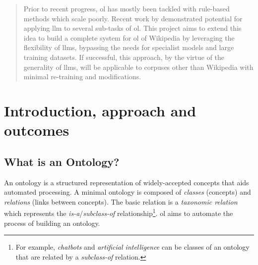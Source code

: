 
\begin{abstract}
    \noindent Prior to recent progress, \gls{ol} has mostly been tackled with rule-based methods which scale poorly. Recent work by \citet{llms4ol} demonstrated potential for applying \gls{llm} to several sub-tasks of \gls{ol}. This project aims to extend this idea to build a complete system for \gls{ol} of Wikipedia by leveraging the flexibility of \gls{llm}s, bypassing the needs for specialist models and large training datasets. If successful, this approach, by the virtue of the generality of \gls{llm}s, will be applicable to corpuses other than Wikipedia with minimal re-training and modifications.
\end{abstract}

\section*{Introduction, approach and outcomes}



\subsection*{What is an Ontology?}

An ontology is a structured representation of widely-accepted concepts that aids automated processing. A minimal ontology is composed of \emph{classes} (concepts) and \emph{relations} (links between concepts). The basic relation is a \emph{taxonomic relation} which represents the \emph{is-a}/\emph{subclass-of} relationship\footnote{For example, \emph{chatbots} and \emph{artificial intelligence} can be classes of an ontology that are related by a \emph{subclass-of} relation.}. \gls{ol} aims to automate the process of building an ontology.

